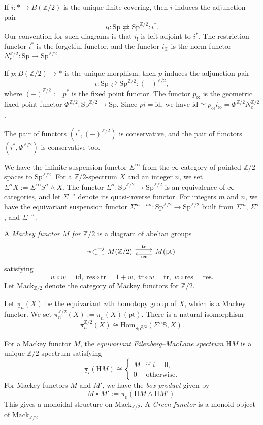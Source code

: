 \documentclass[10pt]{amsart}
\theoremstyle{definition}
\numberwithin{equation}{section}
\newcommand{\Sphere}{\mathbb{S}}
\newcommand{\Z}{\mathbb{Z}}
\newcommand{\rH}{\mathrm{H}}
\newcommand{\ul}{\underline}
\newcommand{\pt}{\mathrm{pt}}
\newcommand{\Mack}{\mathrm{Mack}}
\newcommand{\Sp}{\mathrm{Sp}}
\newcommand{\Hom}{\mathrm{Hom}}
\newcommand{\id}{\mathrm{id}}
\DeclareMathOperator{\sotimes}{\square}
\newcommand{\tr}{\mathrm{tr}}
\newcommand{\res}{\mathrm{res}}
\begin{document}
If $i\colon *\to B (\Z/2)$ is the unique finite covering,
then $i$ induces the adjunction pair
\[
i_! : \Sp \rightleftarrows \Sp^{\Z/2} : i^*.
\]
Our convention for such diagrams is that $i_!$ is left adjoint to $i^*$.
The restriction functor $i^*$ is the forgetful functor,
and the functor $i_\otimes$ is the norm functor $N_e^{\Z/2}\colon \Sp\to \Sp^{\Z/2}$.

If $p\colon B(\Z/2)\to *$ is the unique morphism,
then $p$ induces the adjunction pair
\[
\iota : \Sp\rightleftarrows \Sp^{\Z/2} : (-)^{\Z/2},
\]
where $(-)^{\Z/2}:=p^*$ is the fixed point functor.
The functor $p_\otimes$ is the geometric fixed point functor $\Phi^{\Z/2}\colon \Sp^{\Z/2}\to \Sp$.
Since $pi=\id$,
we have $\id \simeq p_\otimes i_\otimes =\Phi^{\Z/2}N_e^{\Z/2}$.

The pair of functors $(i^*,(-)^{\Z/2})$ is conservative,
and the pair of functors $(i^*,\Phi^{\Z/2})$ is conservative too.

We have the infinite suspension functor $\Sigma^\infty$ from the $\infty$-category of pointed $\Z/2$-spaces to $\Sp^{\Z/2}$.
For a $\Z/2$-spectrum $X$ and an integer $n$,
we set $\Sigma^\sigma X:=\Sigma^\infty S^\sigma\wedge X$.
The functor $\Sigma^\sigma\colon \Sp^{\Z/2}\to \Sp^{\Z/2}$ is an equivalence of $\infty$-categories,
and let $\Sigma^{-\sigma}$ denote its quasi-inverse functor.
For integers $m$ and $n$,
we have the equivariant suspension functor $\Sigma^{m+n\sigma}\colon \Sp^{\Z/2}\to \Sp^{\Z/2}$ built  from $\Sigma^m$, $\Sigma^\sigma$, and $\Sigma^{-\sigma}$.


A \emph{Mackey functor $M$ for $\Z/2$} is a diagram of abelian groups
\[
\begin{tikzcd}
M(\Z/2) \ar[r,shift left=0.75ex,"\tr"]\ar[r,shift right=0.75ex,"\res"',leftarrow]\ar[loop left, out=190, in=170,looseness=7,"w"]&
M(\pt)
\end{tikzcd}
\]
satisfying
\[
w\circ w=\id,
\;
\res\circ\tr=1+w,
\;
\tr\circ w=\tr,
\;
w\circ \res=\res.
\]
Let $\Mack_{\Z/2}$ denote the category of Mackey functors for $\Z/2$.

Let $\ul{\pi}_n(X)$ be the equivariant $n$th homotopy group of $X$,
which is a Mackey functor.
We set $\pi_n^{\Z/2}(X):=\ul{\pi}_n(X)(\pt)$.
There is a natural isomorphism
\[
\pi_n^{\Z/2}(X)\cong \Hom_{\Sp^{\Z/2}}(\Sigma^n \Sphere,X).
\]

For a Mackey functor $M$, the \emph{equivariant Eilenberg--MacLane spectrum $\rH M$} is a unique $\Z/2$-spectrum satisfying
\[
\ul{\pi}_i(\rH M)
\cong
\left\{
\begin{array}{ll}
M & \text{if $i=0$},
\\
0 & \text{otherwise}.
\end{array}
\right.
\]
For Mackey functors $M$ and $M'$, we have the \emph{box product} given by
\[
M\sotimes M':=\ul{\pi}_0(\rH M\wedge \rH M').
\]
This gives a monoidal structure on $\Mack_{\Z/2}$.
A \emph{Green functor} is a monoid object of $\Mack_{\Z/2}$.
\end{document}
